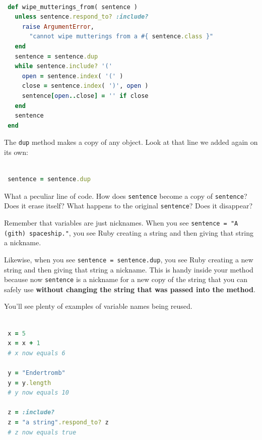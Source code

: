 \documentclass[10pt,twoside]{report}
\begin{document}
\begin{lstlisting}[basicstyle=\ttfamily\color{basiccolor},
    commentstyle = \ttfamily\color{commentcolor},
    keywordstyle=\ttfamily\color{keywordscolor},
    stringstyle=\color{stringcolor},
    language=Ruby,
    basicstyle=\small\ttfamily,
    showstringspaces=false,
  ]

 def wipe_mutterings_from( sentence )
   unless sentence.respond_to? :include?
     raise ArgumentError,
       "cannot wipe mutterings from a #{ sentence.class }"
   end
   sentence = sentence.dup
   while sentence.include? '('
     open = sentence.index( '(' )
     close = sentence.index( ')', open )
     sentence[open..close] = '' if close
   end
   sentence
 end

\end{lstlisting}


The \lstinline[breaklines=true]|dup| method makes a copy of any
object.  Look at that line we added again on its own:


\begin{lstlisting}[basicstyle=\ttfamily\color{basiccolor},
    commentstyle = \ttfamily\color{commentcolor},
    keywordstyle=\ttfamily\color{keywordscolor},
    stringstyle=\color{stringcolor},
    language=Ruby,
    basicstyle=\small\ttfamily,
    showstringspaces=false,
  ]

 sentence = sentence.dup

\end{lstlisting}


What a peculiar line of code.  How does
\lstinline[breaklines=true]|sentence| become a copy of
\lstinline[breaklines=true]|sentence|? Does it erase itself?  What
happens to the original \lstinline[breaklines=true]|sentence|?  Does
it disappear?

Remember that variables are just nicknames.  When you see
\lstinline[breaklines=true]|sentence = "A (gith) spaceship."|, you see
Ruby creating a string and then giving that string a nickname.

Likewise, when you see \lstinline[breaklines=true]|sentence = sentence.dup|, 
you see Ruby creating a new string and then giving that
string a nickname.  This is handy inside your method because now
\lstinline[breaklines=true]|sentence| is a nickname for a new copy of
the string that you can safely use {\bf without changing the string
  that was passed into the method}.

You'll see plenty of examples of variable names being reused.


\begin{lstlisting}[basicstyle=\ttfamily\color{basiccolor},
    commentstyle = \ttfamily\color{commentcolor},
    keywordstyle=\ttfamily\color{keywordscolor},
    stringstyle=\color{stringcolor},
    language=Ruby,
    basicstyle=\small\ttfamily,
    showstringspaces=false,
  ]

 x = 5
 x = x + 1
 # x now equals 6

 y = "Endertromb"
 y = y.length
 # y now equals 10

 z = :include?
 z = "a string".respond_to? z
 # z now equals true

\end{lstlisting}
\end{document}
